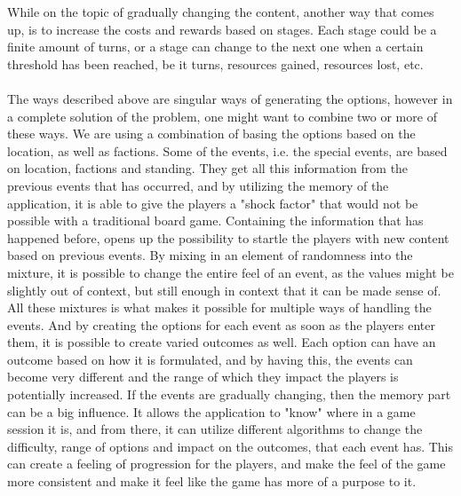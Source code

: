 While on the topic of gradually changing the content, another way that comes up, is to increase the costs and rewards based on stages.
Each stage could be a finite amount of turns, or a stage can change to the next one when a certain threshold has been reached, be it turns, resources gained, resources lost, etc.\\\\


The ways described above are singular ways of generating the options, however in a complete solution of the problem, one might want to combine two or more of these ways. 
We are using a combination of basing the options based on the location, as well as factions. Some of the events, i.e. the special events, are based on location, factions and standing. They get all this information from the previous events that has occurred, and by utilizing the memory of the application, it is able to give the players a "shock factor" that would not be possible with a traditional board game. Containing the information that has happened before, opens up the possibility to startle the players with new content based on previous events. 
By mixing in an element of randomness into the mixture, it is possible to change the entire feel of an event, as the values might be slightly out of context, but still enough in context that it can be made sense of. All these mixtures is what makes it possible for multiple ways of handling the events. And by creating the options for each event as soon as the players enter them, it is possible to create varied outcomes as well. Each option can have an outcome based on how it is formulated, and by having this, the events can become very different and the range of which they impact the players is potentially increased. 
If the events are gradually changing, then the memory part can be a big influence. It allows the application to "know" where in a game session it is, and from there, it can utilize different algorithms to change the difficulty, range of options and impact on the outcomes, that each event has. This can create a feeling of progression for the players, and make the feel of the game more consistent and make it feel like the game has more of a purpose to it.

